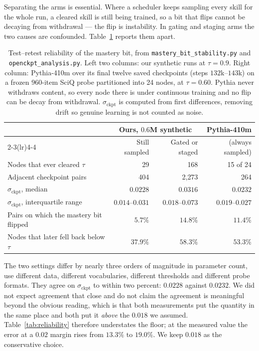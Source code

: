 \documentclass[11pt]{article}
\theoremstyle{plain}
\theoremstyle{definition}
\theoremstyle{remark}
\begin{document}
Separating the arms is essential. Where a scheduler keeps sampling every skill
for the whole run, a cleared skill is still being trained, so a bit that flips
cannot be decaying from withdrawal --- the flip is instability. In gating and
staging arms the two causes are confounded. Table~\ref{tab:bitstability} reports
them apart.

\begin{table}[ht]
\centering
\small
\begin{tabular}{@{}lrrr@{}}
\toprule
& \multicolumn{2}{c}{Ours, $0.6$M synthetic} & Pythia-410m \\
\cmidrule(lr){2-3}\cmidrule(lr){4-4}
& Still sampled & Gated or staged & (always sampled) \\
\midrule
Nodes that ever cleared $\tau$ & 29 & 168 & 15 of 24 \\
Adjacent checkpoint pairs & 404 & 2{,}273 & 264 \\
$\sigma_{\text{ckpt}}$, median & $\mathbf{0.0228}$ & $0.0316$ & $\mathbf{0.0232}$ \\
$\sigma_{\text{ckpt}}$, interquartile range & $0.014$--$0.031$ & $0.018$--$0.073$ & $0.019$--$0.027$ \\
Pairs on which the mastery bit flipped & $5.7\%$ & $14.8\%$ & $\mathbf{11.4\%}$ \\
Nodes that later fell back below $\tau$ & $37.9\%$ & $58.3\%$ & $\mathbf{53.3\%}$ \\
\bottomrule
\end{tabular}
\caption{Test--retest reliability of the mastery bit, from
\texttt{mastery\_bit\_stability.py} and \texttt{openckpt\_analysis.py}. Left two
columns: our synthetic runs at $\tau = 0.9$. Right column: Pythia-410m over its
final twelve saved checkpoints (steps $132$k--$143$k) on a frozen 960-item SciQ
probe partitioned into 24 nodes, at $\tau = 0.60$. Pythia never withdraws
content, so every node there is under continuous training and no flip can be
decay from withdrawal. $\sigma_{\text{ckpt}}$ is computed from first differences,
removing drift so genuine learning is not counted as noise.}
\label{tab:bitstability}
\end{table}

The two settings differ by nearly three orders of magnitude in parameter count,
use different data, different vocabularies, different thresholds and different
probe formats. They agree on $\sigma_{\text{ckpt}}$ to within two percent:
$0.0228$ against $0.0232$. We did not expect agreement that close and do not
claim the agreement is meaningful beyond the obvious reading, which is that both
measurements put the quantity in the same place and both put it \emph{above} the
$0.018$ we assumed. Table~\ref{tab:reliability} therefore understates the floor;
at the measured value the error at a $0.02$ margin rises from $13.3\%$ to
$19.0\%$. We keep $0.018$ as the conservative choice.
\end{document}
